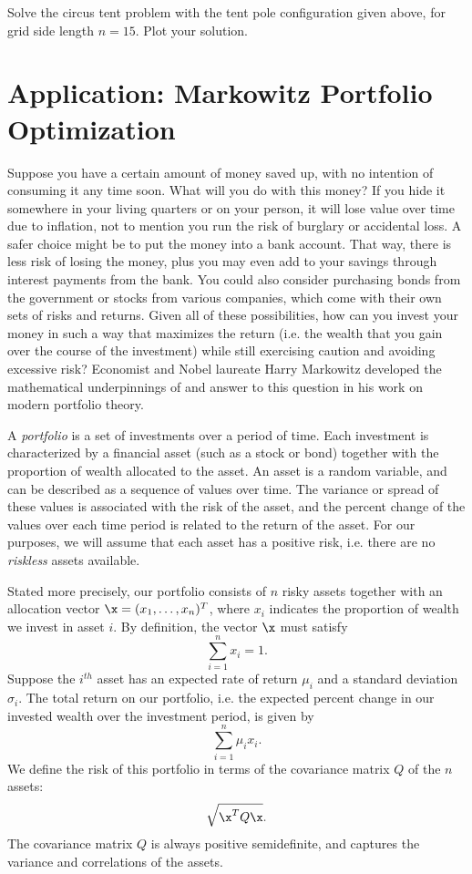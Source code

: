 \begin{problem}
Solve the circus tent problem with the tent pole configuration given above, for grid side length $n = 15$.
Plot your solution.
\end{problem}

\section*{Application: Markowitz Portfolio Optimization}
Suppose you have a certain amount of money saved up, with no intention of consuming it any time soon.
What will you do with this money?
If you hide it somewhere in your living quarters or on your person, it will lose value over time due to inflation, not to mention you run the risk of burglary or accidental loss.
A safer choice might be to put the money into a bank account.
That way, there is less risk of losing the money, plus you may even add to your savings through interest payments from the bank.
You could also consider purchasing bonds from the government or stocks from various companies, which come with their own sets of risks and returns.
Given all of these possibilities, how can you invest your money in such a way that maximizes the return (i.e. the wealth that you gain over the course of the investment) while still exercising caution and avoiding excessive risk?
Economist and Nobel laureate Harry Markowitz developed the mathematical underpinnings of and answer to this question in his work on modern portfolio theory.

A \emph{portfolio} is a set of investments over a period of time.
Each investment is characterized by a financial asset (such as a stock or bond) together with the proportion of wealth allocated to the asset.
An asset is a random variable, and can be described as a sequence of values over time.
The variance or spread of these values is associated with the risk of the asset, and the percent change of the values over each time period is related to the return of the asset.
For our purposes, we will assume that each asset has a positive risk, i.e. there are no \emph{riskless} assets available.

Stated more precisely, our portfolio consists of $n$ risky assets together with an allocation vector
$\x = (x_1,\ldots,x_n)^T$, where $x_i$ indicates the proportion of wealth we invest in asset $i$.
By definition, the vector $\x$ must satisfy \[\sum_{i=1}^n x_i = 1.\]
Suppose the $i^{th}$ asset has an expected rate of return $\mu_i$ and a standard deviation $\sigma_i$.
The total return on our portfolio, i.e. the expected percent change in our invested wealth over the investment period, is given by
\[\sum_{i=1}^n \mu_ix_i.\]
We define the risk of this portfolio in terms of the covariance matrix $Q$ of the $n$ assets: \[\sqrt{\x^T Q \x}.\]
The covariance matrix $Q$ is always positive semidefinite, and captures the variance and correlations of the assets.


